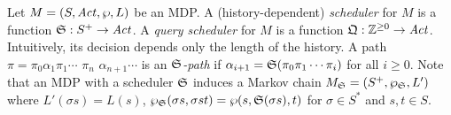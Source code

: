Let $M = (S, \mathit{Act}, \wp, L)$ be an MDP. A (history-dependent)
\emph{scheduler} for $M$ is a function $\mathfrak{S} : S^+
\rightarrow \mathit{Act}$. A \emph{query scheduler} for $M$ is a function
$\mathfrak{Q} : \mathbb{Z}^{\geq 0} \rightarrow \mathit{Act}$. Intuitively, its decision depends only the length of the history.
A path $\pi =
\pi_0 \alpha_1 \pi_1 \cdots$ $\pi_n$ $\alpha_{n+1} \cdots$ is an
\emph{$\mathfrak{S}$-path} if $\alpha_{i+1} = \mathfrak{S}(\pi_0
\pi_1 \cdots \pi_i)$ for all $i \geq 0$.
Note that an MDP with a
scheduler $\mathfrak{S}$ induces a Markov chain $M_{\mathfrak{S}} =
(S^+, \wp_{\mathfrak{S}}, L')$ where $L' (\sigma s) = L (s)$,
$\wp_{\mathfrak{S}} (\sigma s, \sigma s t) = \wp (s,
\mathfrak{S}(\sigma s), t)$ for $\sigma \in S^*$ and $s, t \in S$.


